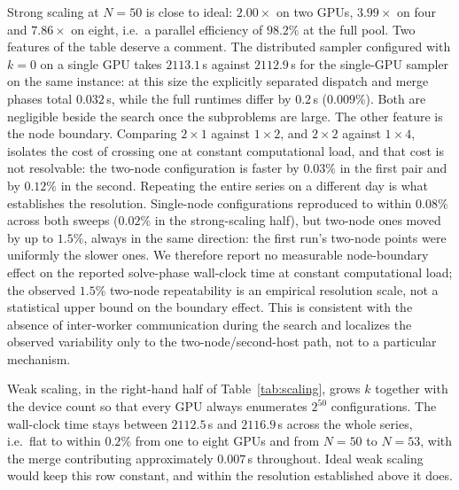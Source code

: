 \documentclass[preprint,12pt,a4paper]{elsarticle}
\begin{document}
Strong scaling at $N=50$ is close to ideal: $2.00\times$ on two GPUs, $3.99\times$ on four and
$7.86\times$ on eight, i.e.\ a parallel efficiency of $98.2\%$ at the full pool. Two features
of the table deserve a comment. The distributed sampler configured with $k=0$ on a single GPU
takes $2113.1$\,s against $2112.9$\,s for the single-GPU sampler on the same instance: at this
size the explicitly separated dispatch and merge phases total $0.032$\,s, while the full
runtimes differ by $0.2$\,s ($0.009\%$). Both are negligible beside the search once the
subproblems are large. The other feature is the node boundary. Comparing $2\times1$ against
$1\times2$, and $2\times2$ against $1\times4$, isolates the cost of crossing one at constant
computational load, and that cost is not resolvable: the two-node configuration is faster
by $0.03\%$ in the first pair and by $0.12\%$ in the second. Repeating the entire series on a
different day is what establishes the resolution. Single-node configurations reproduced to
within $0.08\%$ across both sweeps ($0.02\%$ in the strong-scaling half), but two-node ones
moved by up to $1.5\%$, always in the same direction: the first run's two-node points were
uniformly the slower ones. We therefore report no measurable node-boundary effect on the reported
solve-phase wall-clock time at constant computational load; the observed $1.5\%$ two-node
repeatability is
an empirical resolution scale, not a statistical upper bound on the boundary effect. This
is consistent with the absence of inter-worker communication during the search and localizes
the observed variability only to the two-node/second-host path, not to a particular mechanism.

Weak scaling, in the right-hand half of Table~\ref{tab:scaling}, grows $k$ together with the
device count so that every GPU always enumerates $2^{50}$ configurations. The wall-clock time
stays between $2112.5$\,s and $2116.9$\,s across the whole series, i.e.\ flat to within
$0.2\%$ from one to eight GPUs and from $N=50$ to $N=53$, with the merge contributing
approximately $0.007$\,s throughout. Ideal weak scaling would keep this row constant, and within the
resolution established above it does.
\end{document}
